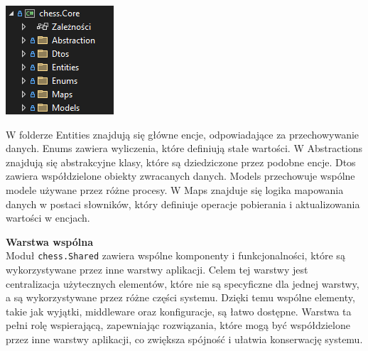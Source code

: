 \documentclass[twoside]{projektInzynierskiMS1}
\begin{document}
\vspace{0.5cm}
\noindent
\begin{minipage}[t]{0.4\textwidth}
    \vspace{0pt}
    \centering
    \includegraphics[width=\linewidth]{images/struktura_back_core.png} 
\end{minipage}
\hfill
\begin{minipage}[t]{0.5\textwidth}
    \vspace{0pt}
    \justifying 
    \noindent
    W folderze Entities znajdują się główne encje, odpowiadające za przechowywanie danych. Enums zawiera wyliczenia, które definiują stałe wartości. W Abstractions znajdują się abstrakcyjne klasy, które są dziedziczone przez podobne encje. Dtos zawiera współdzielone obiekty zwracanych danych. Models przechowuje wspólne modele używane przez różne procesy. W Maps znajduje się logika mapowania danych w postaci słowników, który definiuje operacje pobierania i aktualizowania wartości w encjach.
\end{minipage}

\newpage

\noindent \textbf{Warstwa wspólna}\\
Moduł \texttt{chess.Shared} zawiera wspólne komponenty i funkcjonalności, które są wykorzystywane przez inne warstwy aplikacji. Celem tej warstwy jest centralizacja użytecznych elementów, które nie są specyficzne dla jednej warstwy, a są wykorzystywane przez różne części systemu. Dzięki temu wspólne elementy, takie jak wyjątki, middleware oraz konfiguracje, są łatwo dostępne. Warstwa ta pełni rolę wspierającą, zapewniając rozwiązania, które mogą być współdzielone przez inne warstwy aplikacji, co zwiększa spójność i ułatwia konserwację systemu.
\end{document}

